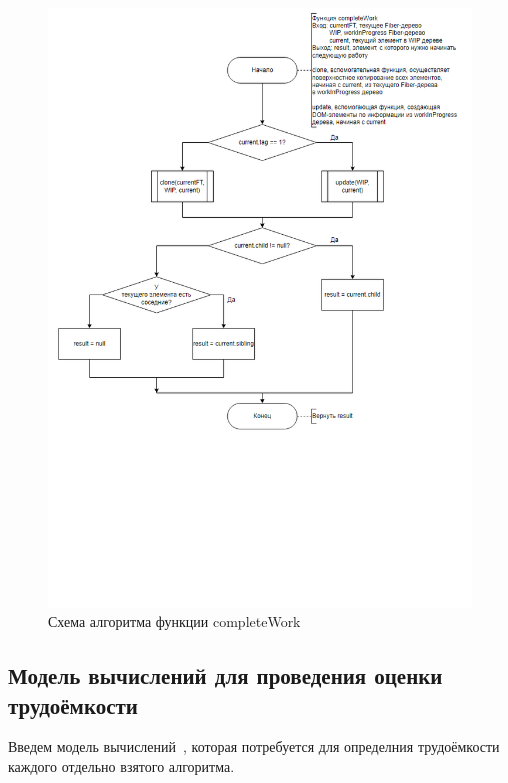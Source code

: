 \begin{figure}[h]
	\centering
	\includegraphics[width=170mm]{img/fiber-complete-work.png}
	\caption{Схема алгоритма функции completeWork}
	\label{fig:fiber-complete-work}
\end{figure}



\clearpage

\subsection{Модель вычислений для проведения оценки трудоёмкости}

Введем модель вычислений~\cite{model}, которая потребуется для определния трудоёмкости каждого отдельно взятого алгоритма.

